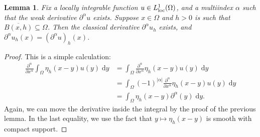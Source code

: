 \documentclass{book}
\renewcommand{\d}{\mathrm{d}}
\newcommand{\abs}[1]{\left\lvert {#1} \right\rvert}
\newcommand{\pdv}[3][]{\frac{\partial^#1 {#2}}{\partial{#3}^{#1}}}
\newtheorem{lemma}[theorem]{Lemma}
\theoremstyle{definition}
\numberwithin{equation}{chapter}
\begin{document}
\begin{lemma} \label{lem:mollifAndDiffCommute}
    Fix a locally integrable function $u \in L^1_{\rm loc}(\Omega)$, and a multiindex $\alpha$ such that the weak derivative $\partial^\alpha u$ exists. Suppose $x \in \Omega$ and $h > 0$ is such that $\overline{B(x,h)} \subseteq \Omega$. Then the classical derivative $\partial^\alpha u_h$ exists, and $\partial^\alpha u_h(x) = (\partial^\alpha u)_h(x)$.
\end{lemma}
\begin{proof}
    This is a simple calculation:
    \begin{equation} \begin{aligned}
        \pdv[\alpha]{}{x} \int_\Omega \eta_h(x-y) u(y) \; \d{y} 
        &= \int_\Omega \pdv[\alpha]{}{x} \eta_h(x-y) u(y) \; \d{y} \\
        &= \int_\Omega (-1)^{\abs{\alpha}} \pdv[\alpha]{}{x} \eta_h(x-y) u(y) \; \d{y} \\
        &= \int_\Omega \eta_h(x-y) \partial^\alpha(y) \; \d{y}.
    \end{aligned} \end{equation}
    Again, we can move the derivative inside the integral by the proof of the previous lemma. In the last equality, we use the fact that $y \mapsto \eta_h(x-y)$ is smooth with compact support.
\end{proof}
\end{document}
